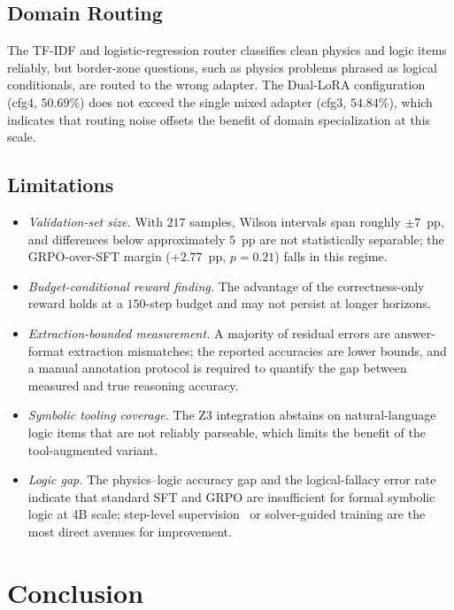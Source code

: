 \documentclass[preprint,12pt]{elsarticle}
\begin{document}
\subsection{Domain Routing}
The TF-IDF and logistic-regression router classifies clean physics and logic
items reliably, but border-zone questions, such as physics problems phrased
as logical conditionals, are routed to the wrong adapter. The Dual-LoRA
configuration (cfg4, $50.69\%$) does not exceed the single mixed adapter
(cfg3, $54.84\%$), which indicates that routing noise offsets the benefit of
domain specialization at this scale.

\subsection{Limitations}
\begin{itemize}
  \item \emph{Validation-set size.} With $217$ samples, Wilson intervals span
        roughly $\pm7$~pp, and differences below approximately $5$~pp are not
        statistically separable; the GRPO-over-SFT margin
        ($+2.77$~pp, $p=0.21$) falls in this regime.
  \item \emph{Budget-conditional reward finding.} The advantage of the
        correctness-only reward holds at a $150$-step budget and may not
        persist at longer horizons.
  \item \emph{Extraction-bounded measurement.} A majority of residual errors
        are answer-format extraction mismatches; the reported accuracies are
        lower bounds, and a manual annotation protocol is required to
        quantify the gap between measured and true reasoning accuracy.
  \item \emph{Symbolic tooling coverage.} The Z3 integration abstains on
        natural-language logic items that are not reliably parseable, which
        limits the benefit of the tool-augmented variant.
  \item \emph{Logic gap.} The physics--logic accuracy gap and the
        logical-fallacy error rate indicate that standard SFT and GRPO are
        insufficient for formal symbolic logic at 4B scale; step-level
        supervision~\cite{Lightman2023,Wang2024mathshepherd} or
        solver-guided training are the most direct avenues for improvement.
\end{itemize}

\section{Conclusion}
\label{sec:conclusion}
\end{document}
